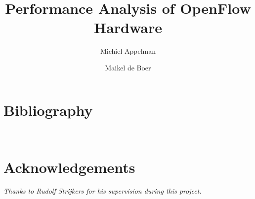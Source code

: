 \documentclass[oneside,10pt,a4paper]{article}
\title{Performance Analysis of OpenFlow Hardware\\[0.3cm]
\Large{}}
\author{Michiel Appelman \and Maikel de Boer}
\begin{document}
	
	
	
	\clearpage

	\acresetall
	\setlength{\parskip}{0ex plus 0.5ex minus 0.2ex}
	
	\tableofcontents
	\clearpage

	\listoffigures
	\listoftables
	\clearpage
	
	\acresetall
		\setlength{\parskip}{1.3ex plus 0.2ex minus 0.2ex}
		\pagestyle{fancy}
		\renewcommand{\sectionmark}[1]{%
		\markboth{#1}{}}
		\fancyhead[L]{\small{\nouppercase{\leftmark}}}
		\fancyhead[R]{\nouppercase{\emph{\chaptername\ \LARGE{\thesection}}}}
		\renewcommand{\headrulewidth}{0.5pt}
		

		
		\clearpage
		
				
		\clearpage
		
						
		\clearpage
		
						
		\clearpage
		
						
		\clearpage
		
		\appendix
		\noappendicestocpagenum
		\addappheadtotoc
		\pagestyle{fancy}
		\renewcommand{\sectionmark}[1]{%
		\markboth{#1}{}}
		\fancyhead[L]{\small{\nouppercase{\leftmark}}}
		\fancyhead[R]{\nouppercase{\emph{\appendixname\ \LARGE{\thesection}}}}
		\renewcommand{\headrulewidth}{0.5pt}

		
		\clearpage

		\renewcommand*{\refname}{} %
		\section{Bibliography}
		
		

		\clearpage
		\pagestyle{empty}
		\hfill \\[6cm]
		\section*{Acknowledgements}
		\textsl{Thanks to Rudolf Strijkers for his supervision during this project.}
\end{document}
